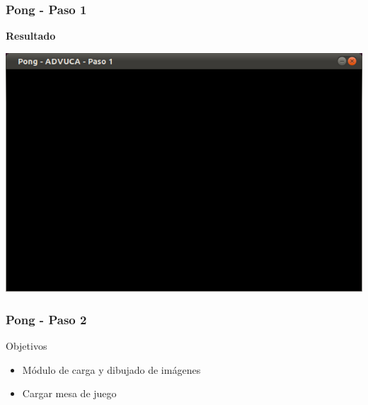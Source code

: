 \begin{frame}
	\frametitle{Pong - Paso 1}
	
    \begin{center}
        \textbf{Resultado}
    \end{center}
	
    \begin{center}
		\includegraphics[scale=0.4]{img/pong-advuca-1.png}
    \end{center}	

\end{frame}

\begin{frame}
	\frametitle{Pong - Paso 2}
	
	\begin{block}{Objetivos}
		\begin{itemize}
			\item Módulo de carga y dibujado de imágenes
			\item Cargar mesa de juego
		\end{itemize}            
	\end{block}

\end{frame}

